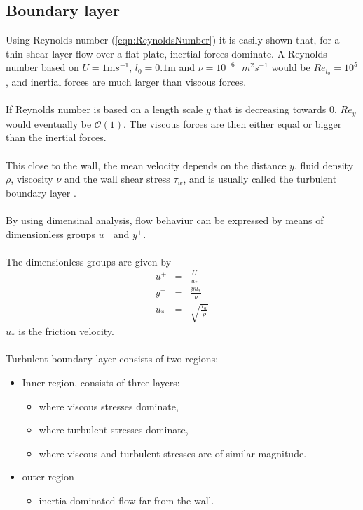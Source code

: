 \documentclass[a4paper, 12pt]{report}
\begin{document}
\subsection{Boundary layer}
\label{sec:boundaryLayer}
Using Reynolds number (\ref{eqn:ReynoldsNumber}) it is easily shown that, for a thin shear layer flow over a flat plate, inertial forces dominate. A Reynolds number based on $U= 1$m$s^{-1}$, $l_0= 0.1$m and $\nu = 10^{-6}\textit{ }m^2s^{-1}$ would be $Re_{l_0} = 10^5$, and inertial forces are much larger than viscous forces.\\
\\
If Reynolds number is based on a length scale $y$ that is decreasing towards $0$, $Re_y$ would eventually be $\mathcal{O}(1)$. The viscous forces are then either equal or bigger than the inertial forces.\\
\\
This close to the wall, the mean velocity depends on the distance $y$, fluid density $\rho$, viscosity $\nu$ and the wall shear stress $\tau_w$, and is usually called the turbulent boundary layer \cite{CFD}.\\
\\
By using dimensinal analysis, flow behaviur can be expressed by means of dimensionless groups $u^+$ and $y^+$.\\
\\
The dimensionless groups are given by \cite{CFD}
\begin{eqnarray}
\label{eqn:upluss}
u^+ &=& \frac{U}{u_*}\\
\label{eqn:ypluss}
y^+ &=& \frac{y u_*}{\nu}\\
\label{eqn:uStar}
u_* &=& \sqrt{\frac{\tau_w}{\rho}} 
\end{eqnarray}
$u_*$ is the friction velocity.\\
\\
Turbulent boundary layer consists of two regions:
\begin{itemize}
\item Inner region, consists of three layers:
	\begin{itemize}
	\item where viscous stresses dominate,
	\item where turbulent stresses dominate,
	\item where viscous and turbulent stresses are of similar magnitude.
	\end{itemize}
\item outer region
	\begin{itemize}
	\item inertia dominated flow far from the wall.
	\end{itemize}
\end{itemize}
\end{document}
